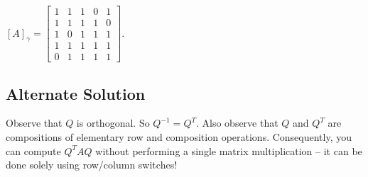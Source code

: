 \documentclass[twoside]{article}
\theoremstyle{definition}
\theoremstyle{definition}
\theoremstyle{remark}
\begin{document}
$[A]_{\gamma} = 
\begin{bmatrix}
    1 & 1 & 1 & 0 & 1 \\
    1 & 1 & 1 & 1 & 0 \\
    1 & 0 & 1 & 1 & 1 \\
    1 & 1 & 1 & 1 & 1 \\
    0 & 1 & 1 & 1 & 1 
\end{bmatrix}$.

\subsection{Alternate Solution}

Observe that $Q$ is orthogonal. So $Q^{-1} = Q^T$. Also observe that $Q$ and $Q^T$ are compositions of elementary row and composition operations.
Consequently, you can compute $Q^T A Q$ without performing a single matrix multiplication -- it can be done solely using row/column switches!
\end{document}
